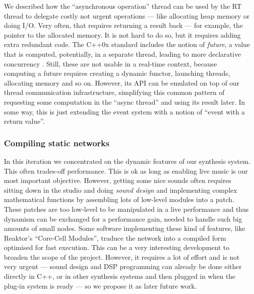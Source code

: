 We described how the ``asynchronous operation'' thread can be used by
the RT thread to delegate costly not urgent operations --- like
allocating heap memory or doing I/O. Very often, that requires
returning a result back --- for example, the pointer to the allocated
memory. It is not hard to do so, but it requires adding extra
redundant code. The C++0x standard includes the notion of
\emph{future}, a value that is computed, potentially, in a separate
thread, leading to more declarative concurrency
\cite{howard06mt}. Still, these are not usable in a real-time context,
because computing a future requires creating a dynamic functor,
launching threads, allocating memory and so on. However, its API can
be emulated on top of our thread communication infrastructure,
simplifying this common pattern of requesting some computation in the
``async thread'' and using its result later. In some way, this is just
extending the event system with a notion of ``event with a return
value''.

\subsubsection{Compiling static networks}

In this iteration we concentrated on the dynamic features of our
synthesis system. This often trades-off performance. This is ok as
long as enabling live music is our most important objective. However,
getting some nice sounds often requires sitting down in the studio and
doing \emph{sound design} and implementing complex
mathematical functions by assembling lots of low-level modules into a
patch. These patches are too low-level to be manipulated in a live
performance and thus dynamism can be exchanged for a performance gain,
needed to handle such big amounts of small nodes. Some software
implementing these kind of features, like Reaktor's ``Core-Cell
Modules'', traduce the network into a compiled form optimised for fast
execution. This can be a very interesting development to broaden the
scope of the project. However, it requires a lot of effort and is not
very urgent --- sound design and DSP programming can already be done
either directly in C++, or in other synthesis systems and then plugged
in when the plug-in system is ready --- so we propose it as later
future work.

